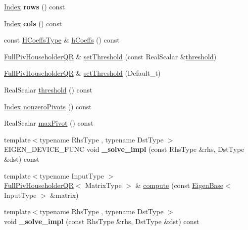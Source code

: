 \begin{DoxyCompactItemize}
\mbox{\label{group___q_r___module_a3b3fd394100b72f5979060b34b94ff01}} 
\hyperlink{namespace_eigen_a62e77e0933482dafde8fe197d9a2cfde}{Index} {\bfseries rows} () const
\item 
\mbox{\label{group___q_r___module_a1849e6c9ba23dfeeaa00f2480d43f826}} 
\hyperlink{namespace_eigen_a62e77e0933482dafde8fe197d9a2cfde}{Index} {\bfseries cols} () const
\item 
const \hyperlink{class_eigen_1_1internal_1_1_tensor_lazy_evaluator_writable}{H\+Coeffs\+Type} \& \hyperlink{group___q_r___module_a874fcd822871010f7961d9e94f1767e4}{h\+Coeffs} () const
\item 
\hyperlink{group___q_r___module_class_eigen_1_1_full_piv_householder_q_r}{Full\+Piv\+Householder\+QR} \& \hyperlink{group___q_r___module_a92277e572bf98245891015d12dd2b602}{set\+Threshold} (const Real\+Scalar \&\hyperlink{group___q_r___module_af7f6ac15ca19c2b9e45dc3eaae58c201}{threshold})
\item 
\hyperlink{group___q_r___module_class_eigen_1_1_full_piv_householder_q_r}{Full\+Piv\+Householder\+QR} \& \hyperlink{group___q_r___module_aaea4bf3dd145e0cddb16e364cca9d887}{set\+Threshold} (Default\+\_\+t)
\item 
Real\+Scalar \hyperlink{group___q_r___module_af7f6ac15ca19c2b9e45dc3eaae58c201}{threshold} () const
\item 
\hyperlink{namespace_eigen_a62e77e0933482dafde8fe197d9a2cfde}{Index} \hyperlink{group___q_r___module_af1e4d04824084a964c1a6e51db68376f}{nonzero\+Pivots} () const
\item 
Real\+Scalar \hyperlink{group___q_r___module_a7887506237a3bf912aebc9aaa8edacec}{max\+Pivot} () const
\item 
\mbox{\label{group___q_r___module_ada7941201fde2fd566f8d6050fea6c2e}} 
{\footnotesize template$<$typename Rhs\+Type , typename Dst\+Type $>$ }\\E\+I\+G\+E\+N\+\_\+\+D\+E\+V\+I\+C\+E\+\_\+\+F\+U\+NC void {\bfseries \+\_\+solve\+\_\+impl} (const Rhs\+Type \&rhs, Dst\+Type \&dst) const
\item 
{\footnotesize template$<$typename Input\+Type $>$ }\\\hyperlink{group___q_r___module_class_eigen_1_1_full_piv_householder_q_r}{Full\+Piv\+Householder\+QR}$<$ Matrix\+Type $>$ \& \hyperlink{group___q_r___module_a41ac74d6615e52e0fd7c0aaa8d3106b4}{compute} (const \hyperlink{group___core___module_struct_eigen_1_1_eigen_base}{Eigen\+Base}$<$ Input\+Type $>$ \&matrix)
\item 
\mbox{\label{group___q_r___module_aa108b4d779b9c131359a542b0850a137}} 
{\footnotesize template$<$typename Rhs\+Type , typename Dst\+Type $>$ }\\void {\bfseries \+\_\+solve\+\_\+impl} (const Rhs\+Type \&rhs, Dst\+Type \&dst) const
\end{DoxyCompactItemize}
